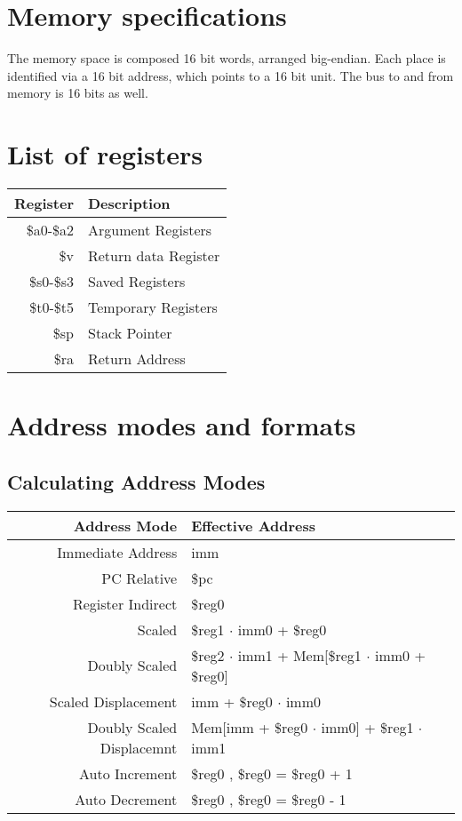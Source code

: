 \documentclass[12pt]{article}
\begin{document}
\section{Memory specifications}
The memory space is composed 16 bit words, arranged big-endian.
Each place is identified via a 16 bit address, which points to a 16 bit unit.
The bus to and from memory is 16 bits as well.
\section{List of registers}
\begin{tabular}{| r | l |}
\hline
\textbf{Register} & \textbf{Description}\\
\hline
\$a0-\$a2 & Argument Registers\\
\$v & Return data Register\\
\$s0-\$s3 & Saved Registers\\
\$t0-\$t5 & Temporary Registers\\
\$sp & Stack Pointer\\
\$ra & Return Address\\ 
\hline
\end {tabular}

\section{Address modes and formats}
\subsection{Calculating Address Modes}
\begin{tabular}{| r | l |}
\hline
\textbf{Address Mode} & \textbf {Effective Address} \\
\hline
Immediate Address & imm\\
PC Relative & \$pc \\
Register Indirect & \$reg0\\
Scaled & \$reg1 $\cdot$ imm0 + \$reg0\\
Doubly Scaled & \$reg2 $\cdot$ imm1 + Mem[\$reg1 $\cdot$ imm0 + \$reg0]\\
Scaled Displacement & imm + \$reg0 $\cdot$ imm0\\
Doubly Scaled Displacemnt & Mem[imm + \$reg0 $\cdot$ imm0] + \$reg1 $\cdot$ imm1\\
Auto Increment & \$reg0 , \$reg0 = \$reg0 + 1\\
Auto Decrement & \$reg0 , \$reg0 = \$reg0 - 1\\
\hline
\end{tabular}
\end{document}
